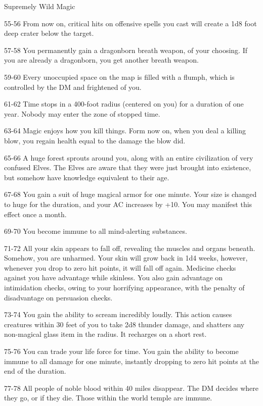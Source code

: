 \begin{rolltable}[0.6\textheight/0pt]{Supremely Wild Magic}
\item[55-56] From now on, critical hits on offensive spells you cast will create a 1d8 foot deep crater below the target.
\item[57-58] You permanently gain a dragonborn breath weapon, of your choosing. If you are already a dragonborn, you get another breath weapon.
\item[59-60] Every unoccupied space on the map is filled with a flumph, which is controlled by the DM and frightened of you.
\item[61-62] Time stops in a 400-foot radius (centered on you) for a duration of one year. Nobody may enter the zone of stopped time.
\item[63-64] Magic enjoys how you kill things.
Form now on, when you deal a killing blow, you regain health equal to the damage the blow did.
\item[65-66] A huge forest sprouts around you, along with an entire civilization of very confused Elves.
The Elves are aware that they were just brought into existence, but somehow have knowledge equivalent to their age.
\item[67-68] You gain a suit of huge magical armor for one minute. 
Your size is changed to huge for the duration, and your AC increases by +10.
You may manifest this effect once a month.
\item[69-70] You become immune to all mind-alerting substances.
\item[71-72] All your skin appears to fall off, revealing the muscles and organs beneath. 
Somehow, you are unharmed.
Your skin will grow back in 1d4 weeks, however, whenever you drop to zero hit points, it will fall off again.
Medicine checks against you have advantage while skinless.
You also gain advantage on intimidation checks, owing to your horrifying appearance, with the penalty of disadvantage on persuasion checks.
\item[73-74] You gain the ability to scream incredibly loudly.
This action causes creatures within 30 feet of you to take 2d8 thunder damage, and shatters any non-magical glass item in the radius.
It recharges on a short rest.
\item[75-76] You can trade your life force for time.
You gain the ability to become immune to all damage for one minute, instantly dropping to zero hit points at the end of the duration.
\item[77-78] All people of noble blood within 40 miles disappear.
The DM decides where they go, or if they die.
Those within the world temple are immune.

\end{rolltable}
